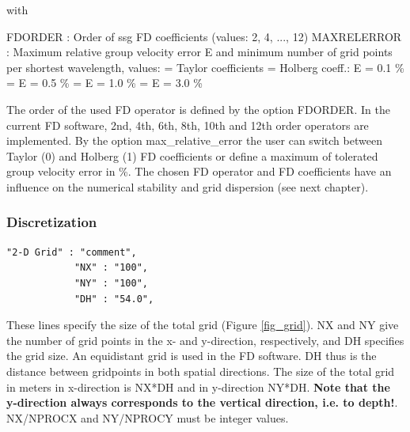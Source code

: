 \documentclass[11pt,onecolumn,oneside]{article}
\begin{document}
with 

FDORDER : Order of ssg FD coefficients (values: 2, 4, ..., 12)\newline
MAXRELERROR : Maximum relative group velocity error E and minimum number of grid points per shortest wavelength, values: = Taylor coefficients = Holberg coeff.: E = 0.1 \%  =                 E = 0.5 \%  =                 E = 1.0 \%  =                 E = 3.0 \% \newline

The order of the used FD operator is defined by the option FDORDER. In the current FD software, 2nd, 4th, 6th, 8th, 10th and 12th order operators are implemented. By the option max\_relative\_error the user can switch between Taylor (0) and Holberg (1) FD coefficients or define a maximum of tolerated group velocity error in \%. The chosen FD operator and FD coefficients have an influence on the numerical stability and grid dispersion (see next chapter).

\subsubsection{Discretization}

\begin{verbatim}
"2-D Grid" : "comment",
			"NX" : "100",
			"NY" : "100",
			"DH" : "54.0",
\end{verbatim}

These lines specify the size of the total grid (Figure  \ref{fig_grid}). NX and NY give the number of grid points in the x- and y-direction, respectively, and DH specifies the grid size. An equidistant grid is used in the FD software. DH thus is the distance between gridpoints in both spatial directions. The size of the total grid in meters in x-direction is NX*DH and in y-direction NY*DH.
\textbf{Note that the y-direction always corresponds to the vertical direction, i.e. to depth!}. NX/NPROCX and NY/NPROCY must be integer values.
\end{document}
